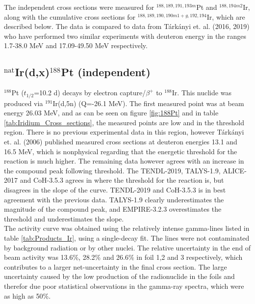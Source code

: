 The independent cross sections were measured for $^{188,189, 191, 193m}$Pt and $^{188,194m2}$Ir, along with the cumulative cross sections for $^{188,189,190, 190m1+g, 192,194}$Ir, which are described below. The data is compared to data from Tárkányi et. al. (2016, 2019) \cite{Tarkanyi2006a, Tarkanyi2019} who have performed two similar experiments with deuteron energy in the ranges 1.7-38.0 MeV and 17.09-49.50 MeV  respectively. 

\subsection{$^\text{nat}$Ir(d,x)$^{188}$Pt (independent)}
$^{188}$Pt ($t_{1/2}$=10.2 d) decays by electron capture/$\beta^+$ to $^{188}$Ir. This nuclide was produced via $^{191}$Ir(d,5n) \cite{Kondev2018} (Q=-26.1 MeV). The first measured point was at beam energy 26.03 MeV, and as can be seen on figure \ref{fig:188Pt} and in table \ref{tab:Iridium_Cross_sections}, the measured points are low and in the threshold region. There is no previous experimental data in this region, however Tárkányi et. al. (2006) published measured cross sections at deuteron energies 13.1 and 16.5 MeV, which is nonphysical regarding that the energetic threshold for the reaction is much higher. The remaining data however agrees with an increase in the compound peak following threshold. The TENDL-2019, TALYS-1.9, ALICE-2017 and CoH-3.5.3 agrees in where the threshold for the reaction is, but disagrees in the slope of the curve. TENDL-2019 and CoH-3.5.3 is in best agreement with the previous data. TALYS-1.9 clearly underestimates the magnitude of the compound peak, and EMPIRE-3.2.3 overestimates the threshold and underestimates the slope. \\

The activity curve was obtained using the relatively intense gamma-lines listed in table \ref{tab:Products_Ir}, using a single-decay fit. The lines were not contaminated by background radiation or by other nuclei. The relative uncertainty in the end of beam activity was 13.6\%, 28.2\% and 26.6\% in foil 1,2 and 3 respectively, which contributes to a larger net-uncertainty in the final cross section. The large uncertainty caused by the low production of the radionuclide in the foils and therefor due poor statistical observations in the gamma-ray spectra, which were as high as 50\%. 

